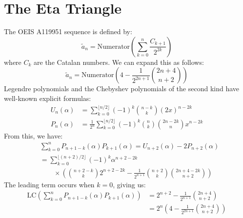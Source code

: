 \documentclass{article}
\theoremstyle{plain}
\begin{document}
    \section{The Eta Triangle}
        The OEIS A119951 sequence is defined by:
        \begin{equation}
            \tilde{a}_{n}
            =\textrm{Numerator}\left(
                \sum_{k=0}^{n}\frac{C_{k+1}}{2^{2k}}
            \right)
        \end{equation}
        where $C_{k}$ are the Catalan numbers. We can expand this as follows:
        \begin{equation}
            \tilde{a}_{n}
            =\textrm{Numerator}\left(
                4-\frac{1}{2^{2n+1}}\binom{2n+4}{n+2}
            \right)
        \end{equation}
        Legendre polynomials and the Chebyshev polynomials of the second kind
        have well-known explicit formulas:
        \begin{subequations}
            \begin{align}
                U_{n}(\alpha)&=
                \sum_{k=0}^{\lfloor{n/2}\rfloor}
                    (-1)^{k}\binom{n-k}{k}(2x)^{n-2k}\\
                P_{n}(\alpha)&=
                \frac{1}{2^{n}}\sum_{k=0}^{\lfloor{n/2}\rfloor}
                    (-1)^{k}\binom{n}{k}\binom{2n-2k}{n}x^{n-2k}
            \end{align}
        \end{subequations}
        From this, we have:
        \begin{subequations}
            \begin{align}
                &\sum_{k=0}^{n}P_{n+1-k}(\alpha)P_{k+1}(\alpha)
                =U_{n+2}(\alpha)-2P_{n+2}(\alpha)\\
                &=\sum_{k=0}^{\lfloor{(n+2)/2}\rfloor}(-1)^{k}\alpha^{n+2-2k}
                \nonumber\\
                &\quad\quad\times\left(
                    \binom{n+2-k}{k}2^{n+2-2k}
                    -\frac{1}{2^{n+1}}\binom{n+2}{k}\binom{2n+4-2k}{n+2}
                \right)
            \end{align}
        \end{subequations}
        The leading term occurs when $k=0$, giving us:
        \begin{subequations}
            \begin{align}
                \textrm{LC}\left(
                    \sum_{k=0}^{n}P_{n+1-k}(\alpha)P_{k+1}(\alpha)
                \right)
                &=2^{n+2}-\frac{1}{2^{n+1}}\binom{2n+4}{n+2}\\
                &=2^{n}\left(
                    4-\frac{1}{2^{2n+1}}\binom{2n+4}{n+2}
                \right)
            \end{align}
        \end{subequations}
    \newpage
    \setcounter{secnumdepth}{0}
\end{document}
